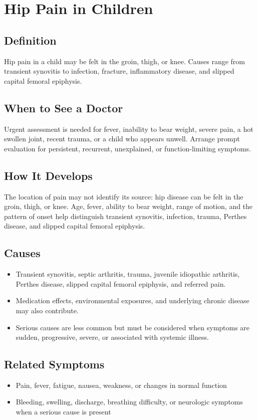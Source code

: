 \chapter{Hip Pain in Children}

\section*{Definition}
Hip pain in a child may be felt in the groin, thigh, or knee. Causes range from transient synovitis to infection, fracture, inflammatory disease, and slipped capital femoral epiphysis.

\section*{When to See a Doctor}
Urgent assessment is needed for fever, inability to bear weight, severe pain, a hot swollen joint, recent trauma, or a child who appears unwell. Arrange prompt evaluation for persistent, recurrent, unexplained, or function-limiting symptoms.

\section*{How It Develops}
The location of pain may not identify its source: hip disease can be felt in the groin, thigh, or knee. Age, fever, ability to bear weight, range of motion, and the pattern of onset help distinguish transient synovitis, infection, trauma, Perthes disease, and slipped capital femoral epiphysis.

\section*{Causes}
\begin{itemize}
  \item Transient synovitis, septic arthritis, trauma, juvenile idiopathic arthritis, Perthes disease, slipped capital femoral epiphysis, and referred pain.
  \item Medication effects, environmental exposures, and underlying chronic disease may also contribute.
  \item Serious causes are less common but must be considered when symptoms are sudden, progressive, severe, or associated with systemic illness.
\end{itemize}

\section*{Related Symptoms}
\begin{itemize}
  \item Pain, fever, fatigue, nausea, weakness, or changes in normal function
  \item Bleeding, swelling, discharge, breathing difficulty, or neurologic symptoms when a serious cause is present
\end{itemize}

